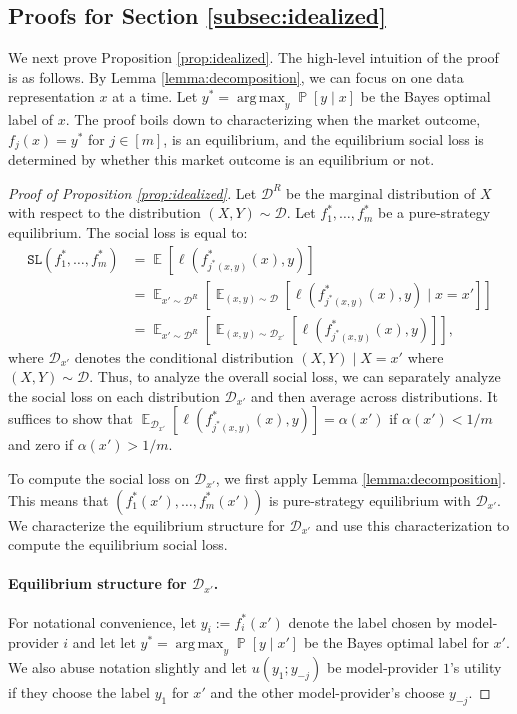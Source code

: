 \documentclass[letterpaper,11pt]{article}
\theoremstyle{plain}
\DeclareMathOperator*{\argmax}{arg\,max}
\DeclareMathOperator*{\E}{\mathbb{E}}
\DeclareMathOperator*{\Prob}{\mathbb{P}}
\begin{document}
\subsection{Proofs for Section \ref{subsec:idealized}}\label{appendix:proofsidealized}


We next prove Proposition \ref{prop:idealized}. The high-level intuition of the proof is as follows. By Lemma \ref{lemma:decomposition}, we can focus on one data representation $x$ at a time. Let $y^* =  \argmax_{y} \Prob[y \mid x]$ be the Bayes optimal label of $x$. The proof boils down to characterizing when the market outcome, $f_j(x) = y^*$ for $j \in [m]$, is an equilibrium, and the equilibrium social loss is determined by whether this market outcome is an equilibrium or not. 
\begin{proof}[Proof of Proposition \ref{prop:idealized}]
Let $\mathcal{D}^R$ be the marginal distribution of $X$ with respect to the distribution $(X,Y) \sim \mathcal{D}$. Let $f^*_1, \ldots, f^*_m$ be a pure-strategy equilibrium. The social loss is equal to:
\begin{align*}
 \texttt{SL}(f^*_1, \ldots, f^*_m) &= \E[\ell(f^*_{j^*(x,y)}(x), y)] \\
 &= \E_{x' \sim \mathcal{D}^R} \left[\E_{(x,y) \sim \mathcal{D}}[\ell(f^*_{j^*(x,y)}(x), y) \mid x = x']\right] \\
 &= \E_{x' \sim \mathcal{D}^R} \left[ \E_{(x,y) \sim \mathcal{D}_{x'}}[\ell(f^*_{j^*(x,y)}(x), y)]\right], 
\end{align*}
where $\mathcal{D}_{x'}$ denotes the conditional distribution $(X,Y) \mid X = x'$ where $(X,Y) \sim \mathcal{D}$. Thus, to analyze the overall social loss, we can separately analyze the social loss on each distribution $\mathcal{D}_{x'}$ and then average across distributions. It suffices to show that $\E_{\mathcal{D}_{x'}}[\ell(f^*_{j^*(x,y)}(x), y)] = \alpha(x')$ if $\alpha(x') < 1/m$ and zero if $\alpha(x') > 1/m$. 

To compute the social loss on $\mathcal{D}_{x'}$, we first apply Lemma \ref{lemma:decomposition}. This means that $(f^*_1(x'), \ldots, f^*_m(x'))$ is pure-strategy equilibrium with $\mathcal{D}_{x'}$. 
We characterize the equilibrium structure for $\mathcal{D}_{x'}$ and use this characterization to compute the equilibrium social loss. 

\paragraph{Equilibrium structure for $\mathcal{D}_{x'}$.} For notational convenience, let $y_i := f^*_i(x')$ denote the label chosen by model-provider $i$ and let 
let $y^* =  \argmax_{y} \Prob[y \mid x']$ be the Bayes optimal label for $x'$. We also abuse notation slightly and let $u(y_1; y_{-j})$ be model-provider $1$'s utility if they choose the label $y_1$ for $x'$ and the other model-provider's choose $y_{-j}$. 


\end{proof}
\end{document}
